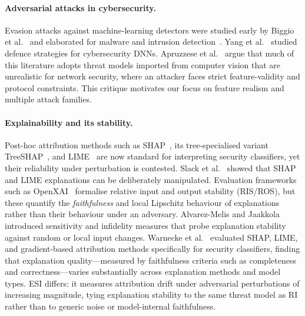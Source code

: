 \documentclass[runningheads]{llncs}
\begin{document}
\paragraph{Adversarial attacks in cybersecurity.}
Evasion attacks against machine-learning detectors were studied early by Biggio
et al.~\cite{biggio2013evasion} and elaborated for malware and intrusion
detection~\cite{papernot2016limitations,grosse2017adversarial}.  Yang et
al.~\cite{yang2020defending} studied defence strategies for cybersecurity DNNs.
Apruzzese et al.~\cite{apruzzese2022modeling} argue that much of this literature
adopts threat models imported from computer vision that are unrealistic for
network security, where an attacker faces strict feature-validity and protocol
constraints.  This critique motivates our focus on feature realism and multiple attack families.

\paragraph{Explainability and its stability.}
Post-hoc attribution methods such as SHAP~\cite{lundberg2017unified}, its
tree-specialised variant TreeSHAP~\cite{lundberg2020treeshap}, and
LIME~\cite{ribeiro2016lime} are now standard for interpreting security classifiers,
yet their reliability under perturbation is contested.  Slack et
al.~\cite{slack2020fooling} showed that SHAP and LIME explanations can be
deliberately manipulated.  Evaluation frameworks such as
OpenXAI~\cite{agarwal2022openxai} formalise relative input and output stability
(RIS/ROS), but these quantify the \emph{faithfulness} and local Lipschitz
behaviour of explanations rather than their behaviour under an adversary.
Alvarez-Melis and Jaakkola~\cite{alvarezmelis2018robust} introduced sensitivity
and infidelity measures that probe explanation stability against random or local
input changes.  Warnecke et al.~\cite{warnecke2020evaluating} evaluated SHAP,
LIME, and gradient-based attribution methods specifically for security classifiers,
finding that explanation quality---measured by faithfulness criteria such as
completeness and correctness---varies substantially across explanation methods
and model types.  ESI differs: it measures attribution drift under adversarial perturbations of
increasing magnitude, tying explanation stability to the same threat model as RI
rather than to generic noise or model-internal faithfulness.
\end{document}
